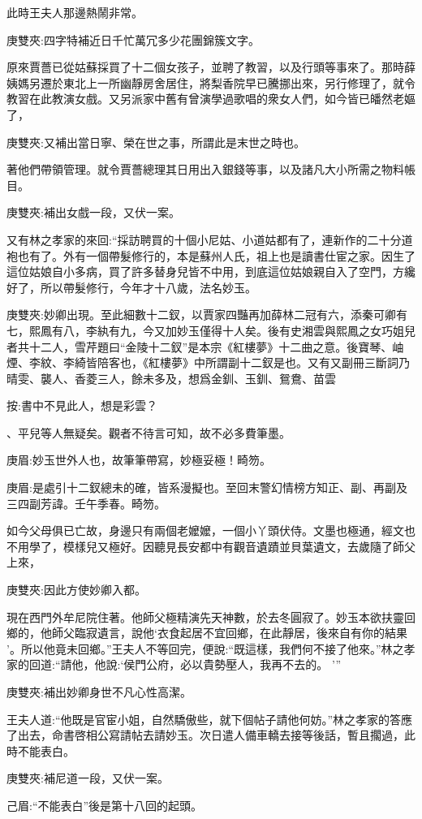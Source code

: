 \begin{parag}
    此時王夫人那邊熱鬧非常。\begin{note}庚雙夾:四字特補近日千忙萬冗多少花團錦簇文字。\end{note}原來賈薔已從姑蘇採買了十二個女孩子，並聘了教習，以及行頭等事來了。那時薛姨媽另遷於東北上一所幽靜房舍居住，將梨香院早已騰挪出來，另行修理了，就令教習在此教演女戲。又另派家中舊有曾演學過歌唱的衆女人們，如今皆已皤然老嫗了，\begin{note}庚雙夾:又補出當日寧、榮在世之事，所謂此是末世之時也。\end{note}著他們帶領管理。就令賈薔總理其日用出入銀錢等事，以及諸凡大小所需之物料帳目。\begin{note}庚雙夾:補出女戲一段，又伏一案。\end{note}又有林之孝家的來回:“採訪聘買的十個小尼姑、小道姑都有了，連新作的二十分道袍也有了。外有一個帶髮修行的，本是蘇州人氏，祖上也是讀書仕宦之家。因生了這位姑娘自小多病，買了許多替身兒皆不中用，到底這位姑娘親自入了空門，方纔好了，所以帶髮修行，今年才十八歲，法名妙玉。\begin{note}庚雙夾:妙卿出現。至此細數十二釵，以賈家四豔再加薛林二冠有六，添秦可卿有七，熙鳳有八，李紈有九，今又加妙玉僅得十人矣。後有史湘雲與熙鳳之女巧姐兒者共十二人，雪芹題曰“金陵十二釵”是本宗《紅樓夢》十二曲之意。後寶琴、岫煙、李紋、李綺皆陪客也，《紅樓夢》中所謂副十二釵是也。又有又副冊三斷詞乃晴雯、襲人、香菱三人，餘未多及，想爲金釧、玉釧、鴛鴦、苗雲\begin{subnote}按:書中不見此人，想是彩雲？\end{subnote}、平兒等人無疑矣。觀者不待言可知，故不必多費筆墨。\end{note}\begin{note}庚眉:妙玉世外人也，故筆筆帶寫，妙極妥極！畸笏。\end{note}\begin{note}庚眉:是處引十二釵總未的確，皆系漫擬也。至回末警幻情榜方知正、副、再副及三四副芳諱。壬午季春。畸笏。\end{note}如今父母俱已亡故，身邊只有兩個老嬤嬤，一個小丫頭伏侍。文墨也極通，經文也不用學了，模樣兒又極好。因聽見長安都中有觀音遺蹟並貝葉遺文，去歲隨了師父上來，\begin{note}庚雙夾:因此方使妙卿入都。\end{note}現在西門外牟尼院住著。他師父極精演先天神數，於去冬圓寂了。妙玉本欲扶靈回鄉的，他師父臨寂遺言，說他‘衣食起居不宜回鄉，在此靜居，後來自有你的結果 ’。所以他竟未回鄉。”王夫人不等回完，便說:“既這樣，我們何不接了他來。”林之孝家的回道:“請他，他說:‘侯門公府，必以貴勢壓人，我再不去的。 ’”\begin{note}庚雙夾:補出妙卿身世不凡心性高潔。\end{note}王夫人道:“他既是官宦小姐，自然驕傲些，就下個帖子請他何妨。”林之孝家的答應了出去，命書啓相公寫請帖去請妙玉。次日遣人備車轎去接等後話，暫且擱過，此時不能表白。\begin{note}庚雙夾:補尼道一段，又伏一案。\end{note}\begin{note}己眉:“不能表白”後是第十八回的起頭。\end{note}
\end{parag}



